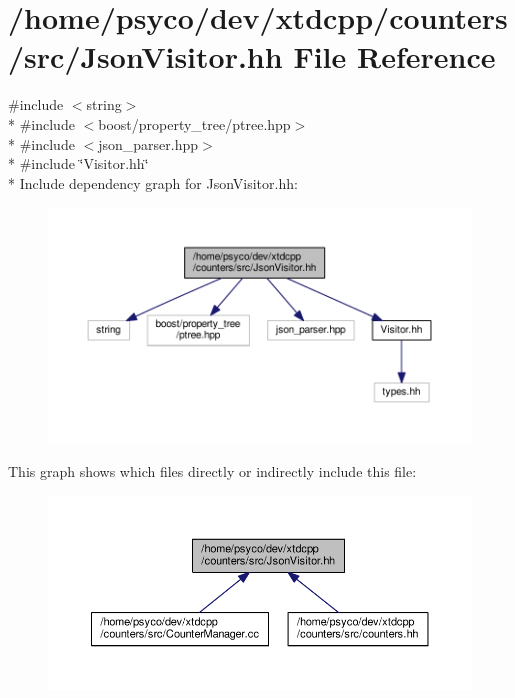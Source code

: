 \hypertarget{JsonVisitor_8hh}{}\section{/home/psyco/dev/xtdcpp/counters/src/\+Json\+Visitor.hh File Reference}
\label{JsonVisitor_8hh}
{\ttfamily \#include $<$string$>$}\\*
{\ttfamily \#include $<$boost/property\+\_\+tree/ptree.\+hpp$>$}\\*
{\ttfamily \#include $<$json\+\_\+parser.\+hpp$>$}\\*
{\ttfamily \#include \char`\"{}Visitor.\+hh\char`\"{}}\\*
Include dependency graph for Json\+Visitor.\+hh\+:
\nopagebreak
\begin{figure}[H]
\begin{center}
\leavevmode
\includegraphics[width=350pt]{JsonVisitor_8hh__incl}
\end{center}
\end{figure}
This graph shows which files directly or indirectly include this file\+:
\nopagebreak
\begin{figure}[H]
\begin{center}
\leavevmode
\includegraphics[width=350pt]{JsonVisitor_8hh__dep__incl}
\end{center}
\end{figure}
